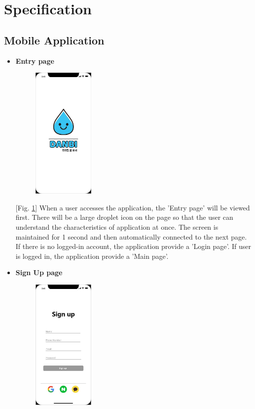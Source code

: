\documentclass[conference]{IEEEtran}
\begin{document}
\section{Specification}

\subsection{Mobile Application}\label{AA}
\begin{itemize}
\setlength{\parindent}{2ex}
\setlength{\parskip}{0.5em}
\item \textbf{Entry page}

\par \begin{figure}[h!]
\includegraphics[width=3cm]{xd/entry page.JPG}
\centering
\caption{}
\label{fig:entry}
\end{figure}

[Fig. \ref{fig:entry}] When a user accesses the application, the 'Entry page' will be viewed first. There will be a large droplet icon on the page so that the user can understand the characteristics of application at once. The screen is maintained for 1 second and then automatically connected to the next page. If there is no logged-in account, the application provide a 'Login page'. If user is logged in, the application provide a 'Main page'.

\item \textbf{Sign Up page}

\par \begin{figure}[h!]
\includegraphics[width=3cm]{xd/sign up page.JPG}
\centering
\caption{}
\label{fig:signup}
\end{figure}


\end{itemize}
\end{document}
